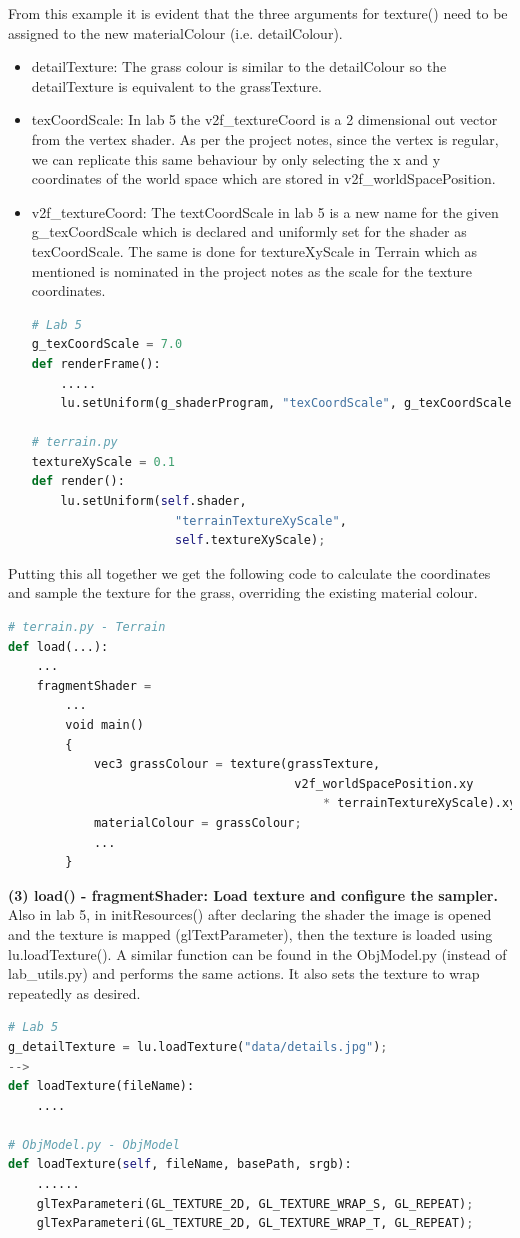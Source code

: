 \documentclass[a4 paper, 12pt]{article}
\begin{document}
From this example it is evident that the three arguments for texture() need to be assigned to the new materialColour (i.e. detailColour).
    \begin{itemize}
        \item detailTexture: The grass colour is similar to the detailColour so the detailTexture is equivalent to the grassTexture.
        \item texCoordScale: In lab 5 the v2f\_textureCoord is a 2 dimensional out vector from the vertex shader. As per the project notes, since the vertex is regular, we can replicate this same behaviour by only selecting the x and y coordinates of the world space which are stored in v2f\_worldSpacePosition.
        \item v2f\_textureCoord: The textCoordScale in lab 5 is a new name for the given g\_texCoordScale which is declared and uniformly set for the shader as texCoordScale. The same is done for textureXyScale in Terrain which as mentioned is nominated in the project notes as the scale for the texture coordinates.    
    \begin{lstlisting}[language=python] 
# Lab 5 
g_texCoordScale = 7.0
def renderFrame():
    .....
    lu.setUniform(g_shaderProgram, "texCoordScale", g_texCoordScale)

# terrain.py
textureXyScale = 0.1
def render():
    lu.setUniform(self.shader, 
                    "terrainTextureXyScale", 
                    self.textureXyScale);
    \end{lstlisting}
    \end{itemize}

Putting this all together we get the following code to calculate the coordinates and sample the texture for the grass, overriding the existing material colour.
    \begin{lstlisting}[language=python] 
# terrain.py - Terrain
def load(...):
    ...
    fragmentShader =
        ...
        void main()
        {
            vec3 grassColour = texture(grassTexture, 
                                        v2f_worldSpacePosition.xy 
                                            * terrainTextureXyScale).xyz;
            materialColour = grassColour;
            ...
        }
    \end{lstlisting}

\textbf{(3) load() - fragmentShader: Load texture and configure the sampler.} \\
Also in lab 5, in initResources() after declaring the shader the image is opened and the texture is mapped (glTextParameter), then the texture is loaded using lu.loadTexture(). A similar function can be found in the ObjModel.py (instead of lab\_utils.py) and performs the same actions. It also sets the texture to wrap repeatedly as desired.
    \begin{lstlisting}[language=python]   
# Lab 5 
g_detailTexture = lu.loadTexture("data/details.jpg");
--> 
def loadTexture(fileName): 
    ....

# ObjModel.py - ObjModel
def loadTexture(self, fileName, basePath, srgb):
    ......
    glTexParameteri(GL_TEXTURE_2D, GL_TEXTURE_WRAP_S, GL_REPEAT);
    glTexParameteri(GL_TEXTURE_2D, GL_TEXTURE_WRAP_T, GL_REPEAT);
    \end{lstlisting}
\end{document}
